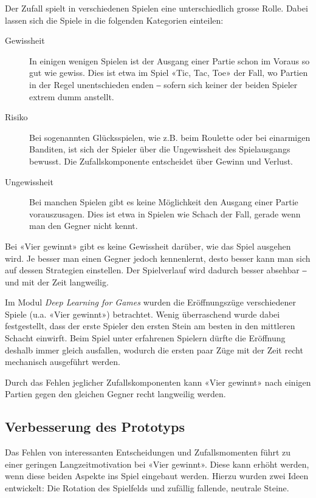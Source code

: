 \documentclass[a4paper,11pt,hidelinks]{scrartcl}
\begin{document}
Der Zufall spielt in verschiedenen Spielen eine unterschiedlich grosse Rolle. Dabei lassen sich die Spiele in die folgenden Kategorien einteilen:

\begin{description}
    \item[Gewissheit] In einigen wenigen Spielen ist der Ausgang einer Partie schon im Voraus so gut wie gewiss. Dies ist etwa im Spiel «Tic, Tac, Toe» der Fall, wo Partien in der Regel unentschieden enden ‒ sofern sich keiner der beiden Spieler extrem dumm anstellt.
    \item[Risiko] Bei sogenannten Glücksspielen, wie z.B. beim Roulette oder bei einarmigen Banditen, ist sich der Spieler über die Ungewissheit des Spielausgangs bewusst. Die Zufallskomponente entscheidet über Gewinn und Verlust.
    \item[Ungewissheit] Bei manchen Spielen gibt es keine Möglichkeit den Ausgang einer Partie vorauszusagen. Dies ist etwa in Spielen wie Schach der Fall, gerade wenn man den Gegner nicht kennt.
\end{description}

Bei «Vier gewinnt» gibt es keine Gewissheit darüber, wie das Spiel ausgehen wird. Je besser man einen Gegner jedoch kennenlernt, desto besser kann man sich auf dessen Strategien einstellen. Der Spielverlauf wird dadurch besser absehbar ‒ und mit der Zeit langweilig.

Im Modul \textit{Deep Learning for Games} wurden die Eröffnungszüge verschiedener Spiele (u.a. «Vier gewinnt») betrachtet. Wenig überraschend wurde dabei festgestellt, dass der erste Spieler den ersten Stein am besten in den mittleren Schacht einwirft. Beim Spiel unter erfahrenen Spielern dürfte die Eröffnung deshalb immer gleich ausfallen, wodurch die ersten paar Züge mit der Zeit recht mechanisch ausgeführt werden.

Durch das Fehlen jeglicher Zufallskomponenten kann «Vier gewinnt» nach einigen Partien gegen den gleichen Gegner recht langweilig werden.

\subsection{Verbesserung des Prototyps}

Das Fehlen von interessanten Entscheidungen und Zufallsmomenten führt zu einer geringen Langzeitmotivation bei «Vier gewinnt». Diese kann erhöht werden, wenn diese beiden Aspekte ins Spiel eingebaut werden. Hierzu wurden zwei Ideen entwickelt: Die Rotation des Spielfelds und zufällig fallende, neutrale Steine.
\end{document}
